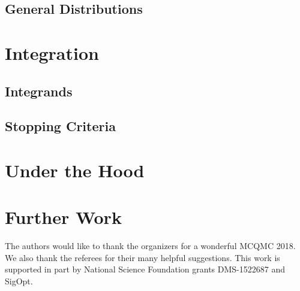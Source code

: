 \documentclass[graybox,footinfo]{svmult}
\begin{document}
\subsection{General Distributions}

\section{Integration}

\subsection{Integrands}

\subsection{Stopping Criteria}

\section{Under the Hood}



\section{Further Work} \label{sec:further}


\begin{acknowledgement}
The authors would like to thank the organizers for a wonderful MCQMC 2018. 
We also thank the referees for their many helpful suggestions.  This work is supported in part by National Science Foundation grants DMS-1522687 and SigOpt.


\end{acknowledgement}



\end{document}
